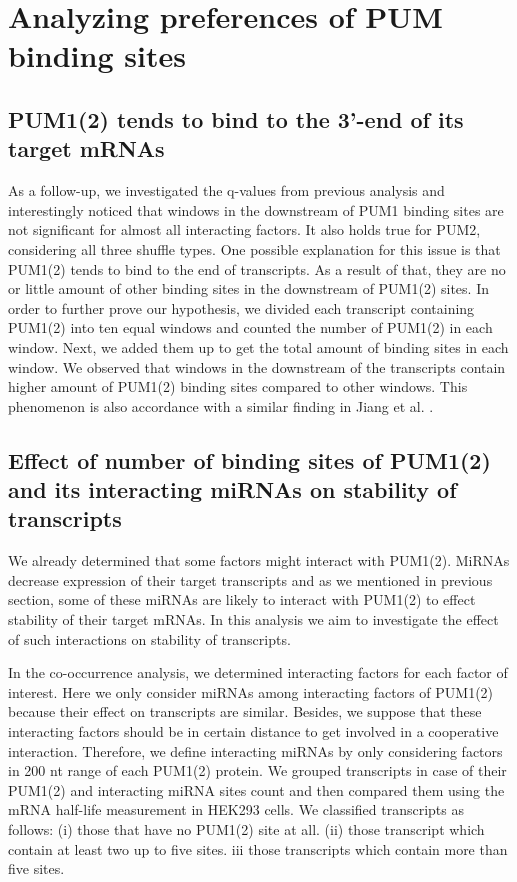 \section{Analyzing preferences of PUM binding sites}

\subsection{PUM1(2) tends to bind to the 3'-end of its target mRNAs}

As a follow-up, we investigated the q-values from previous analysis and interestingly noticed that windows in the downstream of PUM1 binding sites are not significant for almost all interacting factors. It also holds true for PUM2, considering all three shuffle types. One possible explanation for this issue is that PUM1(2) tends to bind to the end of transcripts. As a result of that, they are no or little amount of other binding sites in the downstream of PUM1(2) sites. In order to further prove our hypothesis, we divided each transcript containing PUM1(2) into ten equal windows and counted the number of PUM1(2) in each window. Next, we added them up to get the total amount of binding sites in each window. We observed that windows in the downstream of the transcripts contain higher amount of PUM1(2) binding sites compared to other windows. This phenomenon is also accordance with a similar finding in Jiang et al. \cite{jiang_13}.

\subsection{Effect of number of binding sites of PUM1(2) and its interacting miRNAs on stability of transcripts}

We already determined that some factors might interact with PUM1(2). MiRNAs decrease expression of their target transcripts and as we mentioned in previous section, some of these miRNAs are likely to interact with PUM1(2) to effect stability of their target mRNAs. In this analysis we aim to investigate the effect of such interactions on stability of transcripts. 

In the co-occurrence analysis, we determined interacting factors for each factor of interest. Here we only consider miRNAs among interacting factors of PUM1(2) because their effect on transcripts are similar. Besides, we suppose that these interacting factors should be in certain distance to get involved in a cooperative interaction. Therefore, we define interacting miRNAs by only considering factors in 200 nt range of each PUM1(2) protein. We grouped transcripts in case of their PUM1(2) and interacting miRNA sites count and then compared them using the mRNA half-life measurement in HEK293 cells. We classified transcripts as follows: (i) those that have no PUM1(2) site at all. (ii) those transcript which contain at least two up to five sites. {iii} those transcripts which contain more than five sites.

